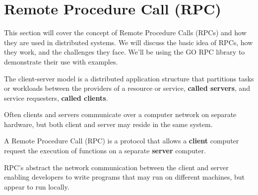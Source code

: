 \newpage 
\section{Remote Procedure Call (RPC)}

This section will cover the concept of Remote Procedure Calls (RPCs) and how they are used in distributed systems. We will discuss the basic idea of RPCs, how they work, and the challenges they face.
We'll be using the GO RPC library to demonstrate their use with examples.


\begin{Def}

    The client-server model is a distributed application structure that partitions tasks or workloads between the providers of a
     resource or service, \textbf{called servers}, and service requesters, \textbf{called clients}. 
     
     Often clients and servers communicate over a computer network on separate hardware, but both client and server may reside in the same system.

\end{Def}

\begin{Def}

    A Remote Procedure Call (RPC) is a protocol that allows a \textbf{client} computer request the execution of functions on a separate \textbf{server} computer.

    RPC's abstract the network communication between the client and server enabling developers to write programs that may run on different machines, but appear to run locally.
\end{Def}


